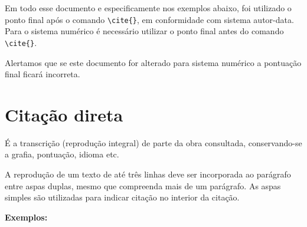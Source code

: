 Em todo esse documento e especificamente nos exemplos abaixo, foi utilizado o ponto final após o comando \verb+\cite{}+, em conformidade com sistema autor-data. Para o sistema numérico é necessário utilizar o ponto final antes do comando \verb+\cite{}+. 

Alertamos que se este documento for alterado para sistema numérico a pontuação final ficará incorreta. \\

\section{Citação direta}

É a transcrição (reprodução integral) de parte da obra consultada, conservando-se a grafia, pontuação, idioma etc.

A reprodução de um texto de até três linhas deve ser incorporada ao parágrafo entre aspas duplas, mesmo que compreenda mais de um parágrafo. As aspas simples são utilizadas para indicar citação no interior da citação.

\textbf{Exemplos:}

